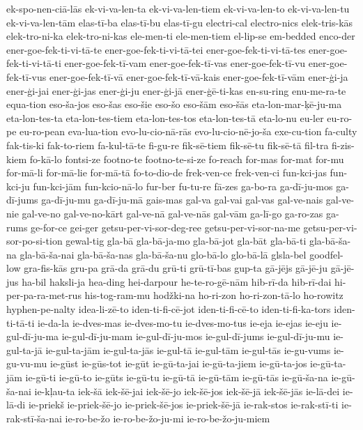 {ek-spo-nen-ciā-lās
ek-vi-va-len-ta
ek-vi-va-len-tiem
ek-vi-va-len-to
ek-vi-va-len-tu
ek-vi-va-len-tām
elas-tī-ba
elas-tī-bu
elas-tī-gu
electri-cal
electro-nics
elek-tris-kās
elek-tro-ni-ka
elek-tro-ni-kas
ele-men-ti
ele-men-tiem
el-lip-se
em-bedded
enco-der
ener-goe-fek-ti-vi-tā-te
ener-goe-fek-ti-vi-tā-tei
ener-goe-fek-ti-vi-tā-tes
ener-goe-fek-ti-vi-tā-ti
ener-goe-fek-tī-vam
ener-goe-fek-tī-vas
ener-goe-fek-tī-vu
ener-goe-fek-tī-vus
ener-goe-fek-tī-vā
ener-goe-fek-tī-vā-kais
ener-goe-fek-tī-vām
ener-ģi-ja
ener-ģi-jai
ener-ģi-jas
ener-ģi-ju
ener-ģi-jā
ener-ģē-ti-kas
en-su-ring
enu-me-ra-te
equa-tion
eso-ša-jos
eso-šas
eso-šie
eso-šo
eso-šām
eso-šās
eta-lon-mar-ķē-ju-ma
eta-lon-tes-ta
eta-lon-tes-tiem
eta-lon-tes-tos
eta-lon-tes-tā
eta-lo-nu
eu-ler
eu-ro-pe
eu-ro-pean
eva-lua-tion
evo-lu-cio-nā-rās
evo-lu-cio-nē-jo-ša
exe-cu-tion
fa-culty
fak-tis-ki
fak-to-riem
fa-kul-tā-te
fi-gu-re
fik-sē-tiem
fik-sē-tu
fik-sē-tā
fil-tra
fi-zis-kiem
fo-kā-lo
fontsi-ze
footno-te
footno-te-si-ze
fo-reach
for-mas
for-mat
for-mu
for-mā-li
for-mā-lie
for-mā-tā
fo-to-dio-de
frek-ven-ce
frek-ven-ci
fun-kci-jas
fun-kci-ju
fun-kci-jām
fun-kcio-nā-lo
fur-ber
fu-tu-re
fā-zes
ga-bo-ra
ga-dī-ju-mos
ga-dī-jums
ga-dī-ju-mu
ga-dī-ju-mā
gais-mas
gal-va
gal-vai
gal-vas
gal-ve-nais
gal-ve-nie
gal-ve-no
gal-ve-no-kārt
gal-ve-nā
gal-ve-nās
gal-vām
ga-lī-go
ga-ro-zas
ga-rums
ge-for-ce
gei-ger
getsu-per-vi-sor-deg-ree
getsu-per-vi-sor-na-me
getsu-per-vi-sor-po-si-tion
gewal-tig
gla-bā
gla-bā-ja-mo
gla-bā-jot
gla-bāt
gla-bā-ti
gla-bā-ša-na
gla-bā-ša-nai
gla-bā-ša-nas
gla-bā-ša-nu
glo-bā-lo
glo-bā-lā
glsla-bel
goodfel-low
gra-fis-kās
gru-pa
grā-da
grā-du
grū-ti
grū-tī-bas
gup-ta
gā-jējs
gā-jē-ju
gā-jē-jus
ha-bil
haksli-ja
hea-ding
hei-darpour
he-te-ro-gē-nām
hib-rī-da
hib-rī-dai
hi-per-pa-ra-met-rus
his-tog-ram-mu
hodžki-na
ho-ri-zon
ho-ri-zon-tā-lo
ho-rowitz
hyphen-pe-nalty
idea-li-zē-to
iden-ti-fi-cē-jot
iden-ti-fi-cē-to
iden-ti-fi-ka-tors
iden-ti-tā-ti
ie-da-la
ie-dves-mas
ie-dves-mo-tu
ie-dves-mo-tus
ie-eja
ie-ejas
ie-eju
ie-gul-dī-ju-ma
ie-gul-dī-ju-mam
ie-gul-dī-ju-mos
ie-gul-dī-jums
ie-gul-dī-ju-mu
ie-gul-ta-jā
ie-gul-ta-jām
ie-gul-ta-jās
ie-gul-tā
ie-gul-tām
ie-gul-tās
ie-gu-vums
ie-gu-vu-mu
ie-gūst
ie-gūs-tot
ie-gūt
ie-gū-ta-jai
ie-gū-ta-jiem
ie-gū-ta-jos
ie-gū-ta-jām
ie-gū-ti
ie-gū-to
ie-gūts
ie-gū-tu
ie-gū-tā
ie-gū-tām
ie-gū-tās
ie-gū-ša-na
ie-gū-ša-nai
ie-kļau-ta
iek-šā
iek-šē-jai
iek-šē-jo
iek-šē-jos
iek-šē-jā
iek-šē-jās
ie-lā-dei
ie-lā-di
ie-priekš
ie-priek-šē-jo
ie-priek-šē-jos
ie-priek-šē-jā
ie-rak-stos
ie-rak-stī-ti
ie-rak-stī-ša-nai
ie-ro-be-žo
ie-ro-be-žo-ju-mi
ie-ro-be-žo-ju-miem
}
